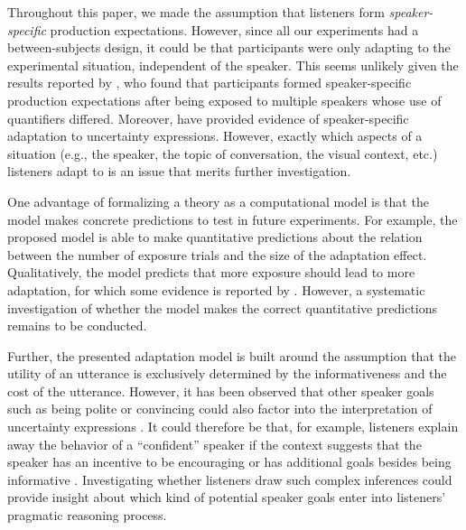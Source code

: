 \documentclass[man, floatsintext]{apa6}
\newcommand{\jd}[1]{\textcolor{PinkyPurple}{\textbf{[jd: #1]}}}
\begin{document}
Throughout this paper, we made the assumption that listeners  form \textit{speaker-specific} production expectations. However,
since all our experiments had a between-subjects design, it could be that participants were only adapting to the experimental
situation, independent of the speaker. This seems unlikely given the results reported by \textcite{Yildirim2016}, who found that
participants formed speaker-specific production expectations after being exposed to multiple speakers whose use of
quantifiers differed. Moreover,  \parencite{Schuster2019} have provided evidence of speaker-specific adaptation to 
uncertainty expressions. However, exactly which aspects of a situation (e.g., the speaker, the topic of conversation, the visual context, etc.)
listeners adapt to is an issue that merits further investigation.


One advantage of formalizing a theory as a computational model is that the model 
makes concrete predictions to test in future experiments. For example, the proposed
model is able to make quantitative predictions about the relation between the number of exposure
trials and the size of the adaptation effect. Qualitatively, the model predicts that more exposure
should lead to more adaptation, for which some evidence is reported by \textcite{Schuster2019}.
However,  a systematic investigation of whether the model makes the correct quantitative predictions remains to be conducted. 


Further, the presented adaptation model is built around the assumption that the utility of an utterance is exclusively determined
by the informativeness and the cost of the utterance. However, it has been observed that other speaker goals such as being polite or
convincing could also factor into the interpretation of uncertainty expressions \parencite[see e.g,][]{Pighin2011,Juanchich2013,Holtgraves2016}.
It could therefore be that, for example, listeners explain away the behavior of a ``confident'' speaker if the context suggests that the speaker
has an incentive to be encouraging or has additional goals besides being informative \parencite[see also][]{Yoon2016,Yoon2017}. Investigating whether listeners draw such complex inferences
could provide  insight about which kind of potential speaker goals enter into listeners' pragmatic reasoning process.
\end{document}
